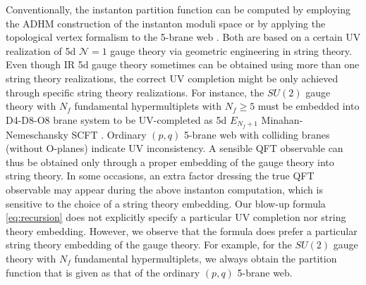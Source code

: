 \documentclass[letterpaper, 11pt]{article}
\begin{document}
{Conventionally, the instanton partition function can be computed by employing the ADHM construction of the instanton moduli space \cite{Atiyah:1978ri,Nekrasov:2002qd,Nekrasov:2003rj} or by applying the topological vertex formalism to the 5-brane web \cite{Aganagic:2003db,Iqbal:2007ii}. Both are based on a certain UV realization of 5d $\mathcal{N}=1$ gauge theory via geometric engineering in string theory. 
Even though IR 5d gauge theory sometimes can be obtained using more than one string theory realizations, the correct UV completion might be only achieved through specific string theory realizations. For instance, the $SU(2)$ gauge theory with $N_f$ fundamental hypermultiplets with $N_f\geq 5$ must be embedded into D4-D8-O8 brane system to be UV-completed as 5d $E_{N_f+1}$ Minahan-Nemeschansky SCFT \cite{Minahan:1996fg, Minahan:1996cj}. Ordinary $(p,q)$ 5-brane web with colliding branes (without O-planes) indicate UV inconsistency. 
A sensible QFT observable can thus be obtained only through a proper embedding of the gauge theory into string theory. In some occasions, an extra factor dressing the true QFT observable may appear during the above instanton computation, which is sensitive to the choice of a string theory embedding.
Our blow-up formula \eqref{eq:recursion} does not explicitly specify a particular UV completion nor string theory embedding. However, we observe that the formula does prefer a particular string theory embedding of the gauge theory. For example, for the $SU(2)$ gauge theory with $N_f$ fundamental hypermultiplets, we always obtain the partition function that is given as that of the ordinary $(p, q)$ 5-brane web. 

}
\end{document}
